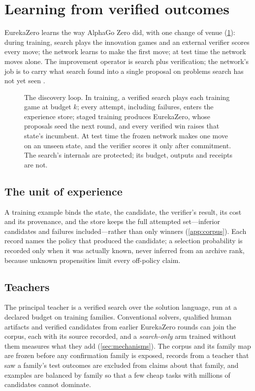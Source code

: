 \section{Learning from verified outcomes}
\label{sec:training}

EurekaZero learns the way AlphaGo Zero did, with one change of venue (\cref{fig:loop}): during
training, search plays the innovation games and an external verifier scores every move; the network
learns to make the first move; at test time the network moves alone. The improvement operator is
search plus verification; the network's job is to carry what search found into a single proposal on
problems search has not yet seen \citep{silver2017zero,anthony2017exit}.

\begin{figure}[t]
\centering

\caption{The discovery loop. In training, a verified search plays each training game at budget $k$;
every attempt, including failures, enters the experience store; staged training produces EurekaZero,
whose proposals seed the next round, and every verified win raises that state's incumbent. At test
time the frozen network makes one move on an unseen state, and the verifier scores it only after
commitment. The search's internals are protected; its budget, outputs and receipts are not.}
\label{fig:loop}
\end{figure}

\subsection{The unit of experience}

A training example binds the state, the candidate, the verifier's result, its cost and its
provenance, and the store keeps the full attempted set---inferior candidates and failures
included---rather than only winners (\cref{app:corpus}). Each record names the policy that produced
the candidate; a selection probability is recorded only when it was actually known, never inferred
from an archive rank, because unknown propensities limit every off-policy claim.

\subsection{Teachers}

The principal teacher is a verified search over the solution language, run at a declared budget on
training families. Conventional solvers, qualified human artifacts and verified candidates from earlier
EurekaZero rounds can join the corpus, each with its source recorded, and a \emph{search-only} arm
trained without them measures what they add (\cref{sec:mechanisms}). The corpus and its family map
are frozen before any confirmation family is exposed, records from a teacher that saw a family's test
outcomes are excluded from claims about that family, and examples are balanced by family so that a few
cheap tasks with millions of candidates cannot dominate.

